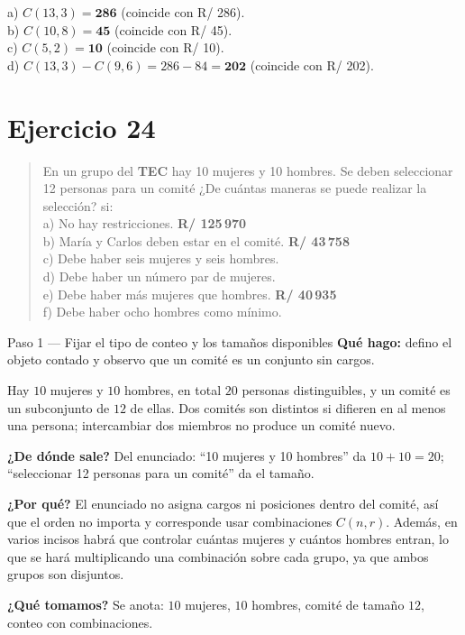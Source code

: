 \documentclass[11pt]{article}
\begin{document}
\begin{resp}
a) $C(13,3)=\mathbf{286}$ (coincide con R/ 286).\\
b) $C(10,8)=\mathbf{45}$ (coincide con R/ 45).\\
c) $C(5,2)=\mathbf{10}$ (coincide con R/ 10).\\
d) $C(13,3)-C(9,6)=286-84=\mathbf{202}$ (coincide con R/ 202).
\end{resp}

\section*{Ejercicio 24}

\begin{quote}
En un grupo del \textbf{TEC} hay 10 mujeres y 10 hombres. Se deben seleccionar 12 personas para un comité ¿De cuántas maneras se puede realizar la selección? si:\\[2pt]
a) No hay restricciones. \quad \textbf{R/ 125\,970}\\
b) María y Carlos deben estar en el comité. \quad \textbf{R/ 43\,758}\\
c) Debe haber seis mujeres y seis hombres.\\
d) Debe haber un número par de mujeres.\\
e) Debe haber más mujeres que hombres. \quad \textbf{R/ 40\,935}\\
f) Debe haber ocho hombres como mínimo.
\end{quote}

\begin{paso}{Paso 1 --- Fijar el tipo de conteo y los tamaños disponibles}
\textbf{Qué hago:} defino el objeto contado y observo que un comité es un conjunto sin cargos.

Hay $10$ mujeres y $10$ hombres, en total $20$ personas distinguibles, y un comité es un subconjunto de $12$ de ellas. Dos comités son distintos si difieren en al menos una persona; intercambiar dos miembros no produce un comité nuevo.

\textbf{¿De dónde sale?} Del enunciado: ``10 mujeres y 10 hombres'' da $10+10=20$; ``seleccionar 12 personas para un comité'' da el tamaño.

\textbf{¿Por qué?} El enunciado no asigna cargos ni posiciones dentro del comité, así que el orden no importa y corresponde usar combinaciones $C(n,r)$. Además, en varios incisos habrá que controlar cuántas mujeres y cuántos hombres entran, lo que se hará multiplicando una combinación sobre cada grupo, ya que ambos grupos son disjuntos.

\textbf{¿Qué tomamos?} Se anota: $10$ mujeres, $10$ hombres, comité de tamaño $12$, conteo con combinaciones.
\end{paso}
\end{document}
